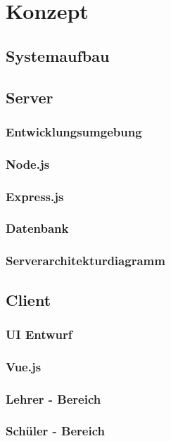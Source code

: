 \section{Konzept}\label{sec:konzept}

\subsection{Systemaufbau}\label{sec:sysaufbau}
\subsection{Server}\label{sec:serverkonzept}
\subsubsection{Entwicklungsumgebung}\label{sec:umgebung}
\subsubsection{Node.js}\label{sec:nodejs}
\subsubsection{Express.js}\label{sec:expressjs}
\subsubsection{Datenbank}\label{sec:datenbank}
\subsubsection{Serverarchitekturdiagramm}\label{sec:serverarchitekt}
\subsection{Client}\label{sec:clientkonzept}
\subsubsection{UI Entwurf}\label{sec:uientwurf}
\subsubsection{Vue.js}\label{sec:vuejs}
\subsubsection{Lehrer - Bereich}\label{sec:lehrerbereich}
\subsubsection{Schüler - Bereich}\label{sec:schuelerbereich}